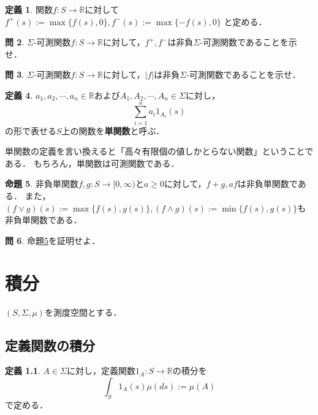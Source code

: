 \documentclass{jsreport}
\theoremstyle{definition}
\newtheorem{defi}{定義}[section]
\newtheorem{prop}[defi]{命題}
\newtheorem{qst}[defi]{問}
\begin{document}
\begin{defi}\label{def_positive_and_negative_part}
関数$f \colon S\to\mathbb{R}$に対して
$f^+(s):=\max\{f(s),0\}, f^-(s):=\max\{-f(s),0\}$
と定める．
\end{defi}

\begin{qst}\label{qst_positive_and_negative_part_are_measurable}
$\Sigma$-可測関数$f \colon S\to\mathbb{R}$に対して，$f^+,f^-$は非負$\Sigma$-可測関数であることを示せ．
\end{qst}

\begin{qst}\label{qst_absolute_is_measurable}
$\Sigma$-可測関数$f \colon S\to\mathbb{R}$に対して，$|f|$は非負$\Sigma$-可測関数であることを示せ．
\end{qst}

\begin{defi}\label{def_simple_function}
$a_1,a_2,\cdots,a_n\in\mathbb{R}$および$A_1,A_2,\cdots,A_n\in\Sigma$に対し，
\[ \sum_{i=1}^n a_i1_{A_i}(s) \]
の形で表せる$S$上の関数を\textbf{単関数}と呼ぶ．
\end{defi}

単関数の定義を言い換えると「高々有限個の値しかとらない関数」ということである．
もちろん，単関数は可測関数である．

\begin{prop}\label{prop_properties_of_nonnegative_simple_function}
非負単関数$f,g \colon S\to[0,\infty)$と$a\geq0$に対して，$f+g, af$は非負単関数である．
また，$(f \vee g)(s):=\max\{f(s),g(s)\}, (f \wedge g)(s):=\min\{f(s),g(s)\}$も非負単関数である．
\end{prop}

\begin{qst}\label{qst_proof_of_properties_of_nonnegative_simple_function}
命題\ref{prop_properties_of_nonnegative_simple_function}を証明せよ．
\end{qst}

\chapter{積分}

$(S,\Sigma,\mu)$を測度空間とする．

\section{定義関数の積分}

\begin{defi}\label{def_indicator_function_integral}
$A\in\Sigma$に対し，定義関数$1_A \colon S\to\mathbb{R}$の積分を
\[ \int_S 1_A(s)\mu(ds):=\mu(A) \]
で定める．
\end{defi}
\end{document}
